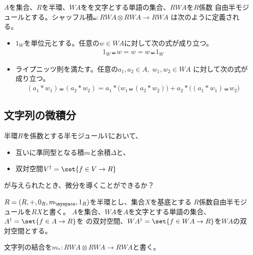 	\begin{definition}[シャッフル積]\label{def:シャッフル積} %
		$A$を集合、$R$を半環、$WA$をを文字とする単語の集合、$RWA$を$R$係数
		自由半モジュールとする。シャッフル積$\shuffle:RWA\otimes RWA\to RWA$
		は次のように定義される。
		\begin{itemize}\setlength{\itemsep}{-1mm} %
			\item $1_W$を単位元とする。任意の$w\in WA$に対して次の式が成り立つ。
			\begin{equation*}\begin{split} %
				1_W \shuffle w = w = w \shuffle 1_W
			\end{split}\end{equation*} %
			\item ライプニッツ則を満たす。任意の$a_1,a_2\in A,\;w_1,w_2\in WA$
			に対して次の式が成り立つ。
			\begin{equation*}\begin{split} %
				(a_1*w_1) \shuffle (a_2*w_2)
				= a_1*\bigl(w_1 \shuffle (a_2*w_2)\bigr)
				+ a_2*\bigl((a_1*w_1) \shuffle w_2\bigr)
			\end{split}\end{equation*} %
		\end{itemize} %
	\end{definition} %

\subsection{文字列の微積分}\label{s2:文字列の微積分} %
	\begin{todo}[余積とライプニッツ則]\label{todo:余積とライプニッツ則} %
		半環$R$を係数とする半モジュール$V$において、
		\begin{itemize}\setlength{\itemsep}{-1mm} %
			\item 互いに準同型となる積$m$と余積$\Delta$と、
			\item 双対空間$V^\dag=\set{f\in V\to R}$
		\end{itemize} %
		が与えられたとき、微分を導くことができるか？
	\end{todo} %
	$R=(R,+,0_R,m_\myspace,1_R)$を半環とし、集合$X$を基底とする
	$R$係数自由半モジュールを$RX$と書く。
	$A$を集合、$WA$を$A$を文字とする単語の集合、$A^\dag=\set{f\in A\to R}$を
	の双対空間、$WA^\dag=\set{f\in WA\to R}$を$WA$の双対空間とする。

	文字列の結合を$m_*:RWA\otimes RWA\to RWA$と書く。

